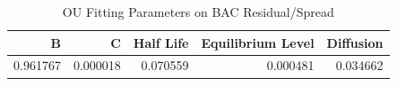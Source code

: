\begin{table}[!ht] 
\centering 
\resizebox{0.7\textwidth}{!} { 
\begin{tabular}{rrrrr}
\toprule
B & C & Half Life & Equilibrium Level & Diffusion \\
\midrule
0.961767 & 0.000018 & 0.070559 & 0.000481 & 0.034662 \\
\bottomrule
\end{tabular}} 
\caption {OU Fitting Parameters on BAC Residual/Spread} 
\label {ou_fitting} 
\end{table} 
\FloatBarrier